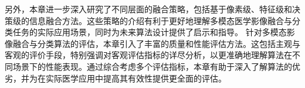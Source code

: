 另外，本章进一步深入研究了不同层面的融合策略，包括基于像素级、特征级和决策级的信息融合方法。这些策略的介绍有利于更好地理解多模态医学影像融合与分类任务的实际应用场景，同时为未来算法设计提供了启示和指导。
针对多模态影像融合与分类算法的评估，本章引入了丰富的质量和性能评估方法。这包括主观与客观的评价手段，特别强调对客观评估指标的详尽分析，以更准确地理解算法在不同场景下的性能表现。通过综合考虑多个评估指标，本章有助于深入了解算法的优劣，并为在实际医学应用中提高其有效性提供更全面的评估。

